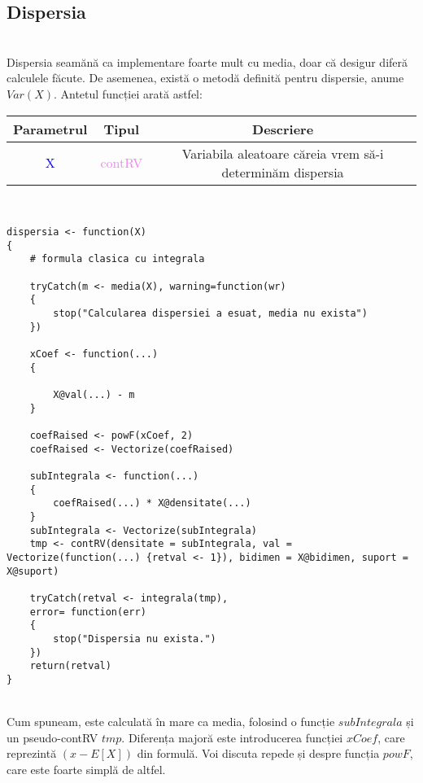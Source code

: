 \documentclass[12pt]{article}
\begin{document}
\subsection{Dispersia} \hfill \\
\indent Dispersia seamănă ca implementare foarte mult cu media, doar că desigur diferă calculele făcute. De asemenea, există o metodă definită pentru dispersie, anume $Var(X)$. Antetul funcției arată astfel:
\begin{center}
	\begin{tabular}{|| c | c | c ||}
		\hline
		Parametrul & Tipul & Descriere \\
		\hline
		\textcolor{blue}{X} & \textcolor{violet}{contRV} & Variabila aleatoare căreia vrem să-i determinăm dispersia\\
		\hline
	\end{tabular}
\end{center}\hfill \\
\begin{lstlisting}
dispersia <- function(X)
{
	# formula clasica cu integrala
	
	tryCatch(m <- media(X), warning=function(wr)
	{
		stop("Calcularea dispersiei a esuat, media nu exista")
	})
	
	xCoef <- function(...)
	{
		
		X@val(...) - m
	}
	
	coefRaised <- powF(xCoef, 2)
	coefRaised <- Vectorize(coefRaised)
	
	subIntegrala <- function(...)
	{
		coefRaised(...) * X@densitate(...)
	}
	subIntegrala <- Vectorize(subIntegrala)
	tmp <- contRV(densitate = subIntegrala, val = Vectorize(function(...) {retval <- 1}), bidimen = X@bidimen, suport = X@suport)
	
	tryCatch(retval <- integrala(tmp),
	error= function(err)
	{
		stop("Dispersia nu exista.")
	})
	return(retval)
}
\end{lstlisting}\hfill \\
\indent Cum spuneam, este calculată în mare ca media, folosind o funcție $subIntegrala$ și un pseudo-contRV $tmp$. Diferența majoră este introducerea funcției $xCoef$, care reprezintă $(x - E[X])$ din formulă. Voi discuta repede și despre funcția $powF$, care este foarte simplă de altfel. \\
\end{document}
